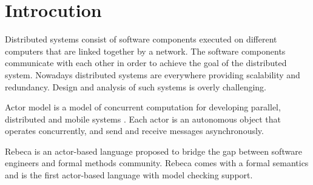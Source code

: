 \section{Introcution} \label{sec::introduction}




Distributed systems consist of software components executed on different computers that are linked together by a network. The software components communicate with each other in order to achieve the goal of the distributed system.
Nowadays distributed systems are everywhere providing scalability and redundancy.  Design and analysis of such systems is overly challenging.

Actor model is a model of concurrent computation for developing parallel, distributed and mobile systems \cite{Hewitt:77:Actors,Agha:97:ActorComputation}. Each actor is an autonomous object that operates concurrently, and  send and receive messages asynchronously.

Rebeca \cite{DBLP:journals/fuin/SirjaniMSB04,DBLP:conf/fmco/Sirjani06} is an actor-based language proposed to bridge the gap between software engineers and formal methods community.
Rebeca comes with a formal semantics and is the first actor-based language with model checking support.


